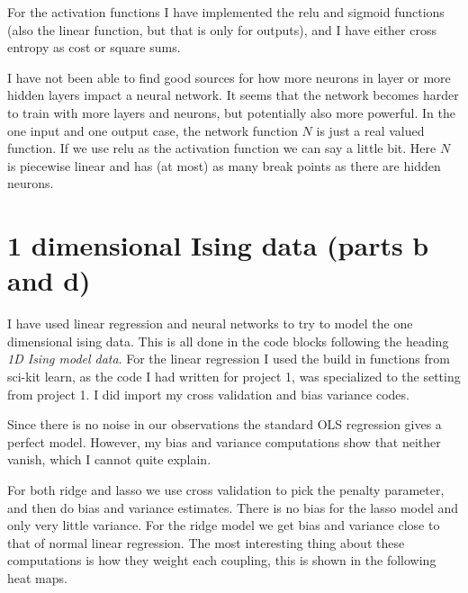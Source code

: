 \documentclass[parskip=half]{scrartcl}
\theoremstyle{definition}
\theoremstyle{remark}
\begin{document}
For the activation functions I have implemented the relu and sigmoid functions (also the linear function, but that is only for outputs), and I have either cross entropy as cost or square sums.  

I have not been able to find good sources for how more neurons in layer or more hidden layers impact a neural network. 
It seems that the network becomes harder to train with more layers and neurons, but potentially also more powerful. 
In the one input and one output case, the network function $N$ is just a real valued function. 
If we use relu as the activation function we can say a little bit. 
Here $N$ is piecewise linear and has (at most) as many break points as there are hidden neurons. 
   
\section{1 dimensional Ising data (parts b and d)} \label{sec:1dising}

I have used linear regression and neural networks to try to model the one dimensional ising data. 
This is all done in the code blocks following the heading \emph{1D Ising model data}. 
For the linear regression I used the build in functions from sci-kit learn, as the code I had written for project 1, was specialized to the setting from project 1. 
I did import my cross validation and bias variance codes.  

Since there is no noise in our observations the standard OLS regression gives a perfect model. 
However, my bias and variance computations show that neither vanish, which I cannot quite explain. 

For both ridge and lasso we use cross validation to pick the penalty parameter, and then do bias and variance estimates. 
There is no bias for the lasso model and only very little variance. 
For the ridge model we get bias and variance close to that of normal linear regression. 
The most interesting thing about these computations is how they weight each coupling, this is shown in the following heat maps.
\end{document}

